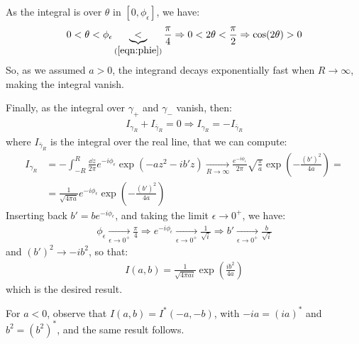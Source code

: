 \documentclass[../template.tex]{subfiles}
\begin{document}
As the integral is over $\theta$ in $[0,\phi_\epsilon]$, we have:
\begin{align*}
    0 < \theta < \phi_\epsilon \underbrace{<}_{(\ref{eqn:phie})}  \frac{\pi}{4} \Rightarrow 0 < 2 \theta < \frac{\pi}{2} \Rightarrow \cos(2 \theta) > 0  
\end{align*}
So, as we assumed $a > 0$, the integrand decays exponentially fast when $R \to \infty$, making the integral vanish.

\medskip

Finally, as the integral over $\gamma_+$ and $\gamma_-$ vanish, then:
\begin{align*}
    I_{\gamma_R} + I_{\bar{\gamma}_{R}} = 0 \Rightarrow I_{{\gamma}_{R}} = -I_{\bar{\gamma}_{R}}
\end{align*}
where $I_{\bar{\gamma}_R}$ is the integral over the real line, that we can compute:
\begin{align*}
    I_{\gamma_R} &= -\int_{-R}^R \frac{\dd{z}}{2 \pi} e^{-i \phi_\epsilon} \exp(-a z^2 - i b' z)  \xrightarrow[R \to \infty]{}    \frac{e^{-i \phi_\epsilon}}{2 \pi} \sqrt{\frac{\pi}{a} }  \exp\left(-\frac{(b')^2}{4a} \right) =\\
    &= \frac{1}{\sqrt{4 \pi a}} e^{-i \phi_\epsilon} \exp\left(-\frac{(b')^2}{4a} \right)
\end{align*}
Inserting back $b' = b e^{-i\phi_\epsilon}$, and taking the limit $\epsilon \to 0^+$, we have:
\begin{align*}
    \phi_\epsilon  \xrightarrow[\epsilon \to 0^+]{}   \frac{\pi}{4} \Rightarrow e^{-i\phi_\epsilon} \xrightarrow[\epsilon \to 0^+]{}  \frac{1}{\sqrt{i}}  \Rightarrow b' \xrightarrow[\epsilon \to 0^+]{}   \frac{b}{\sqrt{i}} 
\end{align*} 
and $(b')^2 \to -ib^2$, so that:
\begin{align*}
    I(a,b) = \frac{1}{\sqrt{4 \pi a i}}  \exp\left(\frac{ib^2}{4a} \right)
\end{align*}
which is the desired result.

\medskip

For $a < 0$, observe that $I(a,b) = I^*(-a,-b)$, with $-ia = (ia)^*$ and $b^2 = (b^2)^*$, and the same result follows.
\end{document}
